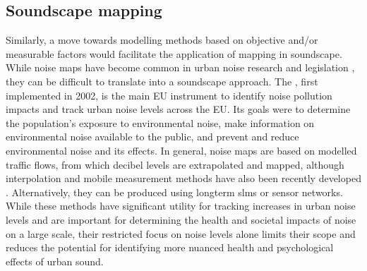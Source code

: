 \subsection{Soundscape mapping}
Similarly, a move towards modelling methods based on objective and/or measurable factors would facilitate the application of mapping in soundscape. While noise maps have become common in urban noise research and legislation \citep{EEA2020Environmental,Gasco2020Social}, they can be difficult to translate into a soundscape approach. The  \citep{Directive200249ECEuropeanUniEuropean}, first implemented in 2002, is the main EU instrument to identify noise pollution impacts and track urban noise levels across the EU. Its goals were to determine the population's exposure to environmental noise, make information on environmental noise available to the public, and prevent and reduce environmental noise and its effects. In general, noise maps are based on modelled traffic flows, from which decibel levels are extrapolated and mapped, although interpolation and mobile measurement methods have also been recently developed \citep{Aumond2018Kriging}. Alternatively, they can be produced using longterm \glspl{slm} or sensor networks. While these methods have significant utility for tracking increases in urban noise levels and are important for determining the health and societal impacts of noise on a large scale, their restricted focus on noise levels alone limits their scope and reduces the potential for identifying more nuanced health and psychological effects of urban sound. 

